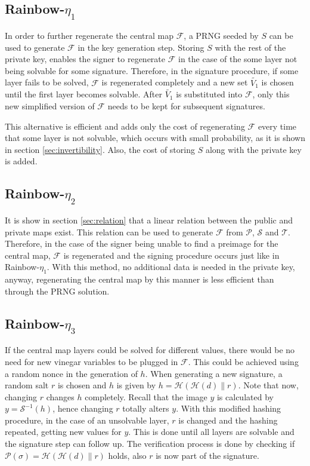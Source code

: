\documentclass{ufsctex/ufsctex}
\begin{document}
\subsection{Rainbow-$\eta_1$}

In order to further regenerate the central map $\mathcal{F}$, a
PRNG seeded by $S$ can be used to
generate $\mathcal{F}$ in the key generation step. Storing $S$ with the rest of
the private key, enables the signer to regenerate $\mathcal{F}$ in the case of
the some layer not being solvable for some signature. Therefore, in the
signature procedure, if some layer fails to be solved, $\mathcal{F}$ is
regenerated completely and a new set $\tilde{V_1}$ is chosen until the first
layer becomes solvable. After $\tilde{V_1}$ is substituted into $\mathcal{F}$,
only this new simplified version of $\mathcal{F}$ needs to be kept for
subsequent signatures.

This alternative is efficient and adds only the cost of regenerating
$\mathcal{F}$ every time that some layer is not solvable, which occurs with
small probability, as it is shown in section \ref{sec:invertibility}. Also, the
cost of storing $S$ along with the private key is added.

\subsection{Rainbow-$\eta_2$}

It is show in section \ref{sec:relation} that a linear relation between the
public and private maps exist. This relation can be used to generate
$\mathcal{F}$ from $\mathcal{P}$, $\mathcal{S}$ and $\mathcal{T}$. Therefore,
in the case of the signer being unable to find a preimage for the central map,
$\mathcal{F}$ is regenerated and the signing procedure occurs just like in
Rainbow-$\eta_1$. With this method, no additional data is needed in the private
key, anyway, regenerating the central map by this manner is less efficient than
through the PRNG solution.

\subsection{Rainbow-$\eta_3$}\label{sec:rainboweta3}

If the central map layers could be solved for different values, there would be
no need for new vinegar variables to be plugged in $\mathcal{F}$. This could be
achieved using a random nonce in the generation of $h$. When generating a new
signature, a random salt $r$ is chosen and $h$ is given by $h =
\mathcal{H}(\mathcal{H}(d) \| r)$. Note that now, changing $r$ changes $h$
completely. Recall that the image $y$ is calculated by $y =
\mathcal{S}^{-1}(h)$, hence changing $r$ totally alters $y$. With this modified
hashing procedure, in the case of an unsolvable layer, $r$ is changed and the
hashing repeated, getting new values for $y$. This is done until all layers are
solvable and the signature step can follow up. The verification process is done
by checking if $\mathcal{P}(\sigma) = \mathcal{H}(\mathcal{H}(d) \| r)$ holds,
also $r$ is now part of the signature.
\end{document}
